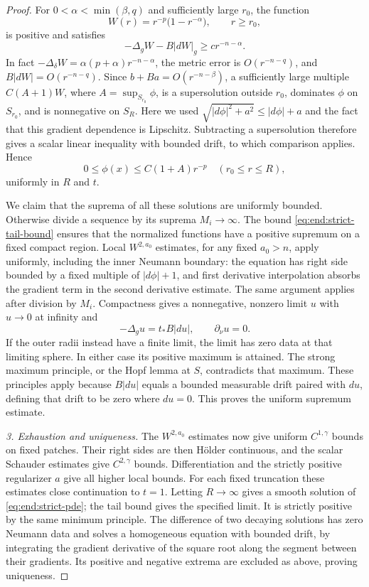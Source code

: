 \begin{proof}
For $0<\alpha<\min(\beta,q)$ and sufficiently large $r_0$,
the function
\[
 W(r)=r^{-p}\bigl(1-r^{-\alpha}\bigr),\qquad r\ge r_0,
\]
is positive and satisfies
\begin{equation}\label{eq:end:strict-barrier}
 -\Delta_gW-B|dW|_g\ge c r^{-n-\alpha}.
\end{equation}
In fact $-\Delta_\delta W=\alpha(p+\alpha)r^{-n-\alpha}$,
the metric error is $O(r^{-n-q})$, and
$B|dW|=O(r^{-n-q})$.  Since $b+Ba=O(r^{-n-\beta})$,
a sufficiently large multiple $C(A+1)W$, where
$A=\sup_{S_{r_0}}\phi$, is a supersolution outside $r_0$,
dominates $\phi$ on $S_{r_0}$, and is nonnegative on $S_R$.
Here we used
$\sqrt{|d\phi|^2+a^2}\le|d\phi|+a$ and the fact that this
gradient dependence is Lipschitz.  Subtracting a supersolution
therefore gives a scalar linear inequality with bounded drift,
to which comparison applies.  Hence
\begin{equation}\label{eq:end:strict-tail-bound}
 0\le\phi(x)\le C(1+A)r^{-p}\quad(r_0\le r\le R),
\end{equation}
uniformly in $R$ and $t$.

We claim that the suprema of all these solutions are uniformly
bounded.  Otherwise divide a sequence by its suprema $M_i\to
\infty$.  The bound \eqref{eq:end:strict-tail-bound} ensures
that the normalized functions have a positive supremum on
a fixed compact region.  Local $W^{2,a_0}$ estimates, for any
fixed $a_0>n$, apply uniformly, including the inner Neumann
boundary: the equation has right side bounded by a fixed
multiple of $|d\phi|+1$, and first derivative interpolation
absorbs the gradient term in the second derivative estimate.
The same argument applies after division by $M_i$.
Compactness gives a nonnegative, nonzero limit $u$ with
$u\to0$ at infinity and
\[
 -\Delta_gu=t_*B|du|,\qquad \partial_\nu u=0.
\]
If the outer radii instead have a finite limit, the limit has
zero data at that limiting sphere.  In either case its positive
maximum is attained.  The strong maximum principle, or the
Hopf lemma at $S$, contradicts that maximum.  These principles
apply because $B|du|$ equals a bounded measurable drift paired
with $du$, defining that drift to be zero where $du=0$.
This proves the uniform supremum estimate.

\medskip\noindent\emph{3. Exhaustion and uniqueness.}
The $W^{2,a_0}$ estimates now give uniform $C^{1,\gamma}$
bounds on fixed patches.  Their right sides are then Hölder
continuous, and the scalar Schauder estimates give
$C^{2,\gamma}$ bounds.  Differentiation and the strictly
positive regularizer $a$ give all higher local bounds.
For each fixed truncation these estimates close continuation
to $t=1$.  Letting $R\to\infty$ gives a smooth solution of
\eqref{eq:end:strict-pde}; the tail bound gives the
specified limit.  It is strictly positive by the same minimum
principle.  The difference of two decaying solutions has zero
Neumann data and solves a homogeneous equation with bounded
drift, by integrating the gradient derivative of the square
root along the segment between their gradients.  Its positive
and negative extrema are excluded as above, proving uniqueness.


\end{proof}
